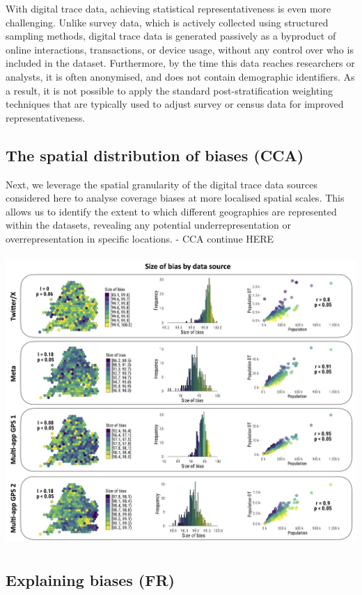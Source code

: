 \documentclass[]{rsos}%
\begin{document}
With digital trace data, achieving statistical representativeness is even more challenging. Unlike survey data, which is actively collected using structured sampling methods, digital trace data is generated passively as a byproduct of online interactions, transactions, or device usage, without any control over who is included in the dataset. Furthermore, by the time this data reaches researchers or analysts, it is often anonymised, and does not contain demographic identifiers. As a result, it is not possible to apply the standard post-stratification weighting techniques that are typically used to adjust survey or census data for improved representativeness.

\subsection{The spatial distribution of biases (CCA)}\label{the-spatial-distribution-of-biases-cca}

Next, we leverage the spatial granularity of the digital trace data
sources considered here to analyse coverage biases at more localised
spatial scales. This allows us to identify the extent to which different
geographies are represented within the datasets, revealing any potential
underrepresentation or overrepresentation in specific locations. - CCA
continue HERE

\includegraphics[width=5.55208in,height=4.35417in]{figures/Fig-size-bias.png}

\subsection{Explaining biases (FR)}\label{explaining-biases-fr}
\end{document}
